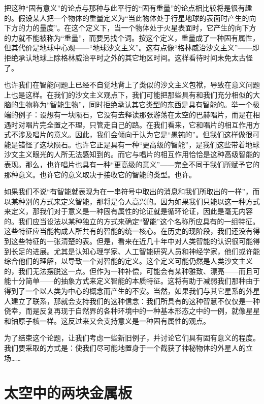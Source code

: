 把这种“固有意义”的论点与那种与此平行的“固有重量”的论点相比较将是很有趣的。假设某人把一个物体的重量定义为“当此物体处于行星地球的表面时产生的向下方的力的量度”。在这个定义下，当一个物体处于火星表面时，它产生的向下方的力就不能被称为“重量”，而要另找个词。按这个定义，重量成了一种固有属性，但其代价是地球中心观——“地球沙文主义”。这有点像“格林威治沙文主义”——即拒绝承认地球上除格林威治平时之外的其它地区时间。这样看待时间未免太古怪了。

也许我们在智能问题上已经不自觉地背上了类似的沙文主义包袱，导致在意义问题上也是这样。在我们的沙文主义观点下，我们可能把那些具有和我们充分相似的大脑的生物称为“智能生物”，同时拒绝承认其它类型的东西是具有智能的。举一个极端的例子：设想有一块陨石，它没有去释读那张游荡在太空的巴赫唱片，而是在相遇时对唱片完全置之不理，只管走自己的路。在我们看来，它和唱片的相互作用方式不涉及唱片的意义。因此，我们会倾向于认为它是“愚钝的”。但我们这样做很可能是错怪了这块陨石。也许它正是具有一种“更高级的智能”，是我们这些带着地球沙文主义眼光的人所无法感知到的。而它与唱片的相互作用恰恰是这种高级智能的表现。那么，也许唱片也具有一种“更高级的意义”——完全不同于我们所赋予它的那种意义。也许它的意义取决于接收它的智能的类型。也许。

如果我们不说“有智能就表现为在一串符号中取出的消息和我们所取出的一样”，而以某种别的方式来定义智能，那将是令人高兴的。因为如果我们只能以这一种方式来定义，那我们对于意义是一种固有属性的论证就是循环论证，因此是毫无内容的。我们应当设法以某种独立的方式来确定“智能”这个名称所应具有的一组特征。这些特征应当能构成人所共有的智能的统一核心。在历史的现阶段，我们还没有得到这些特征的一张清楚的表。但是，看来在近几十年中对人类智能的认识很可能得到长足的进展。尤其是认知心理学家、人工智能研究人员和神经学家，他们或许能综合他们的理解，以导致一个对智能的定义。这个定义可能仍然是人类沙文主义的，我们无法摆脱这一点。但作为一种补偿，可能会有某种雅致、漂亮——而且可能十分简单——的抽象方式来定义智能的本质特征。这将有助于减弱我们那种由于得到了一个以人类为中心的概念而产生的不安。当然，如果我们与其它星系的外星人建立了联系，那就会支持我们的这种信念：我们所具有的这种智慧不仅仅是一种侥幸，而是反复再现于自然界的各种环境中的一种基本形态之中的一例，就像星星和铀原子核一样。这反过来又会支持意义是一种固有属性的观点。

为了结束这个论题，让我们考虑一些新旧例子，并讨论它们具有固有意义的程度。我们要采取的方式是：使我们尽可能地置身于一个截获了神秘物体的外星人的立场……

\section{太空中的两块金属板}

